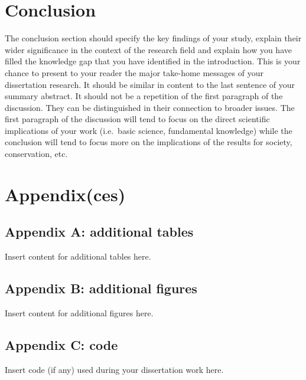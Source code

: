 \documentclass[
  11pt,
]{article}
\begin{document}
\newpage

\hypertarget{conclusion}{%
\section{Conclusion}\label{conclusion}}

The conclusion section should specify the key findings of your study,
explain their wider significance in the context of the research field
and explain how you have filled the knowledge gap that you have
identified in the introduction. This is your chance to present to your
reader the major take-home messages of your dissertation research. It
should be similar in content to the last sentence of your summary
abstract. It should not be a repetition of the first paragraph of the
discussion. They can be distinguished in their connection to broader
issues. The first paragraph of the discussion will tend to focus on the
direct scientific implications of your work (i.e.~basic science,
fundamental knowledge) while the conclusion will tend to focus more on
the implications of the results for society, conservation, etc.

\newpage



\newpage

\hypertarget{appendixces}{%
\section{Appendix(ces)}\label{appendixces}}

\hypertarget{appendix-a-additional-tables}{%
\subsection{Appendix A: additional
tables}\label{appendix-a-additional-tables}}

Insert content for additional tables here.

\newpage

\hypertarget{appendix-b-additional-figures}{%
\subsection{Appendix B: additional
figures}\label{appendix-b-additional-figures}}

Insert content for additional figures here.

\newpage

\hypertarget{appendix-c-code}{%
\subsection{Appendix C: code}\label{appendix-c-code}}

Insert code (if any) used during your dissertation work here.
\end{document}
